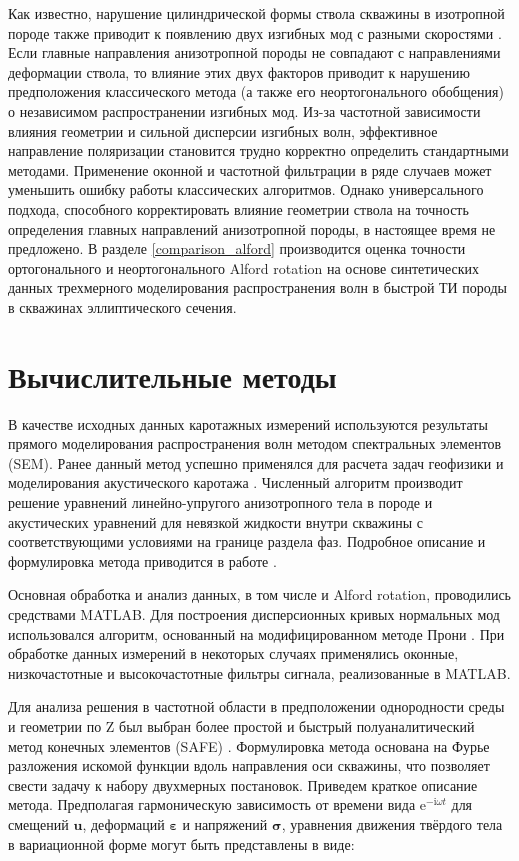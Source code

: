 \documentclass[a4paper,11pt]{article}
\newcommand{\ii}{\mathrm{i}}
\begin{document}
Как известно, нарушение цилиндрической формы ствола скважины в изотропной породе также приводит к появлению двух изгибных мод с разными скоростями \cite{Seroices2010}. Если главные направления анизотропной породы не совпадают с направлениями деформации ствола, то влияние этих двух факторов приводит к нарушению предположения классического метода (а также его неортогонального обобщения) о независимом распространении изгибных мод. Из-за частотной зависимости влияния геометрии и сильной дисперсии изгибных волн, эффективное направление поляризации становится трудно корректно определить стандартными методами.
Применение оконной и частотной фильтрации в ряде случаев может уменьшить ошибку работы классических алгоритмов. Однако универсального подхода, способного корректировать влияние геометрии ствола на точность определения главных направлений анизотропной породы, в настоящее время не предложено. В разделе \ref{comparison_alford} производится оценка точности ортогонального и неортогонального Alford rotation на основе синтетических данных трехмерного моделирования распространения волн в быстрой ТИ породы в скважинах эллиптического сечения.  

\section{Вычислительные методы}

В качестве исходных данных каротажных измерений используются результаты прямого моделирования распространения волн методом спектральных элементов (SEM). Ранее данный метод успешно применялся для расчета задач геофизики \cite{Komatitsch1999} и моделирования акустического каротажа \cite{Charara2011}. Численный алгоритм производит решение уравнений линейно-упругого анизотропного тела в породе и акустических уравнений для невязкой жидкости внутри скважины с соответствующими условиями на границе раздела фаз. Подробное описание и формулировка метода приводится в работе \cite{Komatitsch1999}. %

Основная обработка и анализ данных, в том числе и Alford rotation, проводились средствами MATLAB. Для построения дисперсионных кривых нормальных мод использовался алгоритм, основанный на модифицированном методе Прони \cite{Ekstrom1995}. При обработке данных измерений в некоторых случаях применялись оконные, низкочастотные и высокочастотные фильтры сигнала, реализованные в MATLAB.   

Для анализа решения в частотной области в предположении однородности среды и геометрии по Z был выбран более простой и быстрый полуаналитический метод конечных элементов (SAFE) \cite{Bartoli2006}. Формулировка метода основана на Фурье разложения искомой функции вдоль направления оси скважины, что позволяет свести задачу к набору двухмерных постановок. Приведем краткое описание метода. Предполагая гармоническую зависимость от времени вида $\mathrm{e}^{-\ii\omega t}$ для смещений $\mathbf{u}$, деформаций $\boldsymbol{\varepsilon}$ и напряжений $\boldsymbol{\sigma}$, уравнения движения твёрдого тела в вариационной форме могут быть представлены в виде:
\end{document}
